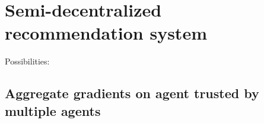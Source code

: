 \chapter{Semi-decentralized recommendation system}
\label{chap:discussion}

Possibilities:

\section{Aggregate gradients on agent trusted by multiple agents}

